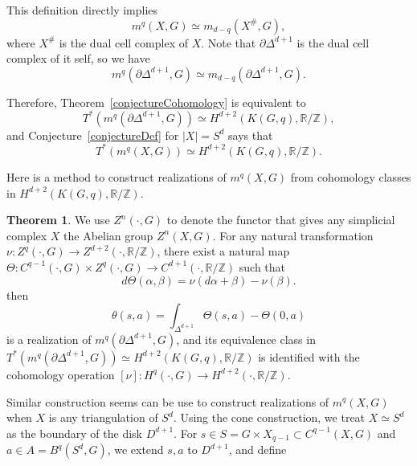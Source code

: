 \documentclass[reprint, amsmath, amssymb, showpacs, floatfix, longbibliography, aps, twocolumn, superscriptaddress, nofootinbib]{revtex4-2}
\newcommand{\ZZ}{{\mathbb Z}}
\newcommand{\RR}{{\mathbb R}}
\theoremstyle{definition}
\newtheorem{theorem}{Theorem}[section]
\begin{document}
This definition directly implies
\begin{equation}
	m^q(X,G)\simeq m_{d-q}(X^\#,G),
\end{equation}
where $X^\#$ is the dual cell complex of $X$. Note that $\partial\Delta^{d+1}$ is the dual cell complex of it self, so we have
\begin{equation}
	m^q(\partial\Delta^{d+1},G)\simeq m_{d-q}(\partial\Delta^{d+1},G).
\end{equation}

Therefore, Theorem~\ref{conjectureCohomology} is equivalent to
\begin{equation}
	T^*(m^q(\partial\Delta^{d+1},G))\simeq H^{d+2}(K(G,q),\RR/\ZZ),
\end{equation}
and Conjecture~\ref{conjectureDef} for $|X|=S^d$ says that
\begin{equation}
	T^*(m^q(X,G))\simeq H^{d+2}(K(G,q),\RR/\ZZ).
\end{equation}

Here is a method to construct realizations of $m^q(X,G)$ from cohomology classes in $ H^{d+2}(K(G,q),\RR/\ZZ)$.

\begin{theorem}\label{thmEvaluation}
	We use $Z^n(\cdot,G)$ to denote the functor that gives any simplicial complex $X$ the Abelian group $Z^n(X,G)$. For any natural transformation
	 $\nu:Z^q(\cdot,G)\rightarrow Z^{d+2}(\cdot,\RR/\ZZ)$, there exist a natural map $\Theta: C^{q-1}(\cdot,G)\times Z^q(\cdot,G)\rightarrow C^{d+1}(\cdot,\RR/\ZZ)$ such that
	\begin{equation}
		d\Theta(\alpha,\beta)=\nu(d\alpha+\beta)-\nu(\beta).
	\end{equation}
	then 
	\begin{equation}
		\theta(s,a)=\int_{\Delta^{d+1}}\Theta(s,a)-\Theta(0,a)
	\end{equation}
	 is a realization of $m^q(\partial\Delta^{d+1},G)$, and its equivalence class in $T^*(m^q(\partial\Delta^{d+1},G))\simeq H^{d+2}(K(G,q),\RR/\ZZ)$ is identified with the cohomology operation $[\nu]:H^q(\cdot,G)\rightarrow H^{d+2}(\cdot,\RR/\ZZ)$.
\end{theorem}

Similar construction seems can be use to construct
realizations of $m^q(X,G)$ when $X$ is any triangulation of $S^d$. Using the cone construction, we treat $X\simeq S^d$ as the boundary of the disk $D^{d+1}$. For $s\in S=G\times X_{q-1}\subset C^{q-1}(X,G)$ and $a\in A=B^{q}(S^d,G)$, we extend $s,a$ to $D^{d+1}$, and define
\end{document}

